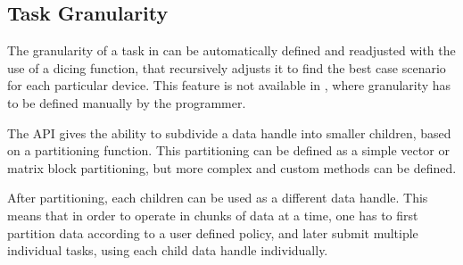 \documentclass[main.tex]{subfiles}
\begin{document}
\subsection{Task Granularity}

The granularity of a task in \gama can be automatically defined and readjusted with the use of a dicing function, that recursively adjusts it to find the best case scenario for each particular device. This feature is not available in \starpu, where granularity has to be defined manually by the programmer.

The API gives the ability to subdivide a data handle into smaller children, based on a partitioning function. This partitioning can be defined as a simple vector or matrix block partitioning, but more complex and custom methods can be defined.

After partitioning, each children can be used as a different data handle. This means that in order to operate in chunks of data at a time, one has to first partition data according to a user defined policy, and later submit multiple individual tasks, using each child data handle individually.
\end{document}

